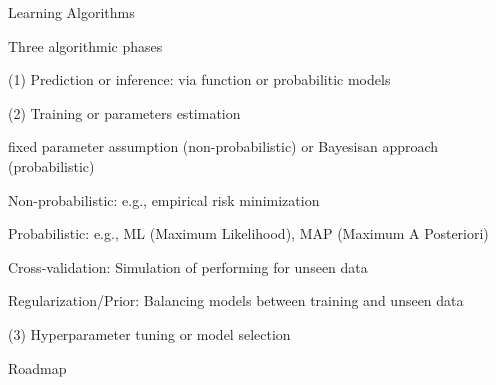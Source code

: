 \documentclass[handout,fleqn,aspectratio=169]{beamer}
\begin{document}
\begin{frame}{Learning Algorithms}

\plitemsep 0.07in

\bci 

\item Three algorithmic phases

\item[(1)] Prediction or inference: via function or probabilitic models

\item[(2)] Training or parameters estimation 

\bci
\item fixed parameter assumption (non-probabilistic) or Bayesisan approach (probabilistic)
\item Non-probabilistic: e.g., empirical risk minimization
\item Probabilistic: e.g., ML (Maximum Likelihood), MAP (Maximum A Posteriori)
\item Cross-validation: Simulation of performing for unseen data
\item Regularization/Prior: Balancing models between training and unseen data

\eci
\item[(3)] Hyperparameter tuning or model selection
\eci
\end{frame}

\begin{frame}{Roadmap}

\plitemsep 0.1in

\bci 

\item {}
\item {} 
\item {}

\eci
\end{frame}
\end{document}
